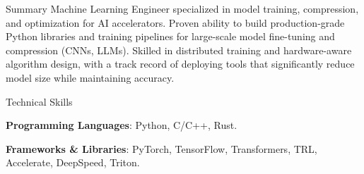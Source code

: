 \documentclass{resume} %
\begin{document}
\begin{rSection}{Summary}
Machine Learning Engineer specialized in model training, compression, and optimization for AI accelerators. Proven ability to build production-grade Python libraries and training pipelines for large-scale model fine-tuning and compression (CNNs, LLMs). Skilled in distributed training and hardware-aware algorithm design, with a track record of deploying tools that significantly reduce model size while maintaining accuracy.
\end{rSection}


\begin{rSection}{Technical Skills}
    \vspace{-1em}
    \item[] \textbf{Programming Languages}: Python, C/C++, Rust.
    \item[] \textbf{Frameworks \& Libraries}: PyTorch, TensorFlow, Transformers, TRL, Accelerate, DeepSpeed, Triton.
\end{rSection}

\end{document}
